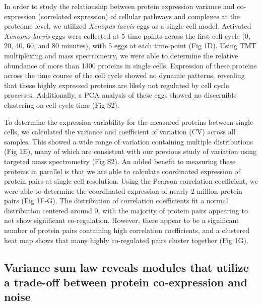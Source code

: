 \documentclass[11pt,]{article}
\begin{document}
In order to study the relationship between protein expression variance
and co-expression (correlated expression) of cellular pathways and
complexes at the proteome level, we utilized \emph{Xenopus laevis} eggs
as a single cell model. Activated \emph{Xenopus laevis} eggs were
collected at 5 time points across the first cell cycle (0, 20, 40, 60,
and 80 minutes), with 5 eggs at each time point (Fig 1D). Using TMT
multiplexing and mass spectrometry, we were able to determine the
relative abundance of more than 1300 proteins in single cells.
Expression of these proteins across the time course of the cell cycle
showed no dynamic patterns, revealing that these highly expressed
proteins are likely not regulated by cell cycle processes. Additionally,
a PCA analysis of these eggs showed no discernible clustering on cell
cycle time (Fig S2).

To determine the expression variability for the measured proteins
between single cells, we calculated the variance and coefficient of
variation (CV) across all samples. This showed a wide range of variation
containing multiple distributions (Fig 1E), many of which are consistent
with our previous study of variation using targeted mass spectrometry
(Fig S2). An added benefit to measuring these proteins in parallel is
that we are able to calculate coordinated expression of protein pairs at
single cell resolution. Using the Pearson correlation coefficient, we
were able to determine the coordinated expression of nearly 2 million
protein pairs (Fig 1F-G). The distribution of correlation coefficients
fit a normal distribution centered around 0, with the majority of
protein pairs appearing to not show significant co-regulation. However,
there appear to be a significant number of protein pairs containing high
correlation coefficients, and a clustered heat map shows that many
highly co-regulated pairs cluster together (Fig 1G).

\hypertarget{variance-sum-law-reveals-modules-that-utilize-a-trade-off-between-protein-co-expression-and-noise}{%
\subsection{Variance sum law reveals modules that utilize a trade-off
between protein co-expression and
noise}\label{variance-sum-law-reveals-modules-that-utilize-a-trade-off-between-protein-co-expression-and-noise}}
\end{document}
